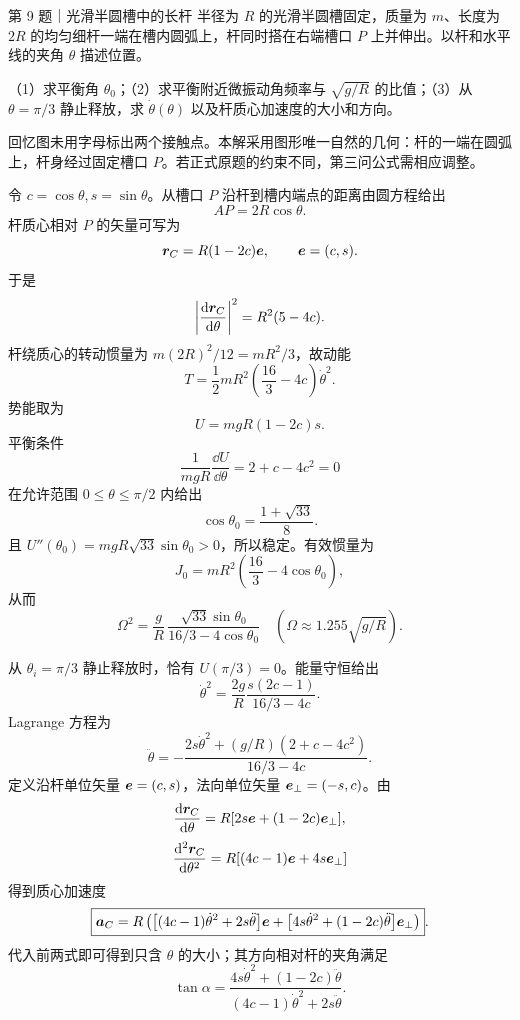 \begin{problem}{第 9 题｜光滑半圆槽中的长杆}
半径为 $R$ 的光滑半圆槽固定，质量为 $m$、长度为 $2R$ 的均匀细杆一端在槽内圆弧上，杆同时搭在右端槽口 $P$ 上并伸出。以杆和水平线的夹角 $\theta$ 描述位置。

（1）求平衡角 $\theta_0$；（2）求平衡附近微振动角频率与 $\sqrt{g/R}$ 的比值；（3）从 $\theta=\pi/3$ 静止释放，求 $\dot\theta(\theta)$ 以及杆质心加速度的大小和方向。
\FigRodBowl
\end{problem}
\begin{identification}
回忆图未用字母标出两个接触点。本解采用图形唯一自然的几何：杆的一端在圆弧上，杆身经过固定槽口 $P$。若正式原题的约束不同，第三问公式需相应调整。
\end{identification}
\begin{solution}
令 $c=\cos\theta,s=\sin\theta$。从槽口 $P$ 沿杆到槽内端点的距离由圆方程给出
\[
AP=2R\cos\theta.
\]
杆质心相对 $P$ 的矢量可写为
\[
\bm{r}_C=R(1-2c)\bm{e},
\qquad
\bm{e}=(c,s).
\]
于是
\[
\left|\frac{\mathop{}\!\mathrm d\bm{r}_C}{\mathop{}\!\mathrm d\theta}\right|^2=R^2(5-4c).
\]
杆绕质心的转动惯量为 $m(2R)^2/12=mR^2/3$，故动能
\[
T=\frac12mR^2\left(\frac{16}{3}-4c\right)\dot\theta^2.
\]
势能取为
\[
U=mgR(1-2c)s.
\]
平衡条件
\[
\frac{1}{mgR}\frac{\dd U}{\dd\theta}=2+c-4c^2=0
\]
在允许范围 $0\le\theta\le\pi/2$ 内给出
\[
\boxed{\cos\theta_0=\frac{1+\sqrt{33}}8}.
\]
且 $U''(\theta_0)=mgR\sqrt{33}\sin\theta_0>0$，所以稳定。有效惯量为
\[
J_0=mR^2\left(\frac{16}{3}-4\cos\theta_0\right),
\]
从而
\[
\boxed{
\Omega^2=\frac gR\,
\frac{\sqrt{33}\sin\theta_0}{16/3-4\cos\theta_0}}
\quad(\Omega\approx1.255\sqrt{g/R}).
\]

从 $\theta_i=\pi/3$ 静止释放时，恰有 $U(\pi/3)=0$。能量守恒给出
\[
\boxed{
\dot\theta^2=\frac{2g}{R}
\frac{s(2c-1)}{16/3-4c}}.
\]
Lagrange 方程为
\[
\boxed{
\ddot\theta=-\frac{2s\dot\theta^2+(g/R)(2+c-4c^2)}{16/3-4c}}.
\]
定义沿杆单位矢量 $\bm{e}=(c,s)$，法向单位矢量 $\bm{e}_\perp=(-s,c)$。由
\[
\frac{\mathop{}\!\mathrm d\bm{r}_C}{\mathop{}\!\mathrm d\theta}=R[2s\bm{e}+(1-2c)\bm{e}_\perp],
\]
\[
\frac{\mathop{}\!\mathrm d^2\bm{r}_C}{\mathop{}\!\mathrm d\theta^2}=R[(4c-1)\bm{e}+4s\bm{e}_\perp]
\]
得到质心加速度
\[
\boxed{
\bm{a}_C=R\left(\bigl[(4c-1)\dot\theta^2+2s\ddot\theta\bigr]\bm{e}
+\bigl[4s\dot\theta^2+(1-2c)\ddot\theta\bigr]\bm{e}_\perp\right)}.
\]
代入前两式即可得到只含 $\theta$ 的大小；其方向相对杆的夹角满足
\[
\tan\alpha=\frac{4s\dot\theta^2+(1-2c)\ddot\theta}{(4c-1)\dot\theta^2+2s\ddot\theta}.
\]
\end{solution}

